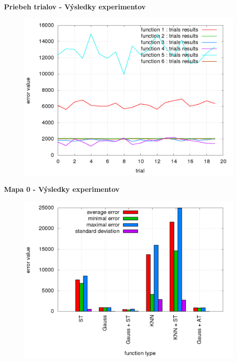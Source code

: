 \documentclass[xcolor=dvipsnames]{beamer}
\begin{document}
\begin{frame}{\bf Priebeh trialov - Výsledky experimentov}

\begin{figure}[!htb]
\centering
\includegraphics[scale=.36]{../../results_q_learning/map_1/trials_average_results_progress.png}
\end{figure}

\end{frame}



\begin{frame}{\bf Mapa 0 - Výsledky experimentov}

\begin{figure}[!htb]
\centering
\includegraphics[scale=.36]{../../results_q_learning/map_0/trials_average_results.png}
\end{figure}

\end{frame}
\end{document}
